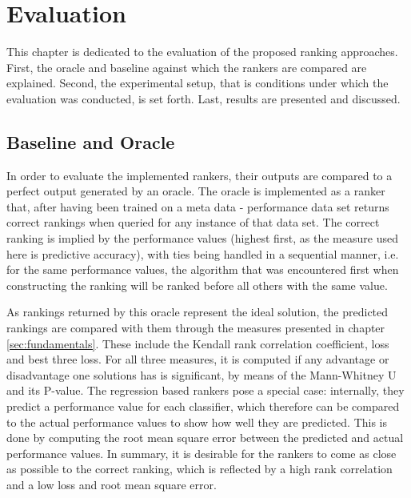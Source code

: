 \chapter{Evaluation}
\label{sec:evaluation}

This chapter is dedicated to the evaluation of the proposed ranking approaches. First, the oracle and baseline against which the rankers are compared are explained. Second, the experimental setup, that is conditions under which the evaluation was conducted, is set forth. Last, results are presented and discussed.

\section{Baseline and Oracle}
In order to evaluate the implemented rankers, their outputs are compared to a perfect output generated by an oracle. The oracle is implemented as a ranker that, after having been trained on a meta data - performance data set returns correct rankings when queried for any instance of that data set. The correct ranking is implied by the performance values (highest first, as the measure used here is predictive accuracy), with ties being handled in a sequential manner, i.e. for the same performance values, the algorithm that was encountered first when constructing the ranking will be ranked before all others with the same value.

As rankings returned by this oracle represent the ideal solution, the predicted rankings are compared with them through the measures presented in chapter \ref{sec:fundamentals}. These include the Kendall rank correlation coefficient, loss and best three loss. For all three measures, it is computed if any advantage or disadvantage one solutions has is significant, by means of the Mann-Whitney U and its P-value. The regression based rankers pose a special case: internally, they predict a performance value for each classifier, which therefore can be compared to the actual performance values to show how well they are predicted. This is done by computing the root mean square error between the predicted and actual performance values. In summary, it is desirable for the rankers to come as close as possible to the correct ranking, which is reflected by a high rank correlation and a low loss and root mean square error.

